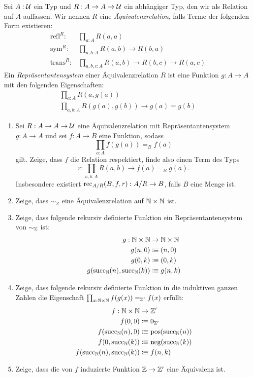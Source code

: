 \documentclass{uebung}
\begin{document}
\begin{bonus}
  Sei $A:\mathcal{U}$ ein Typ und $R:A \to A \to \mathcal{U}$ ein abhängiger Typ, den wir als Relation auf $A$ auffassen.
  Wir nennen $R$ eine \emph{Äquivalenzrelation}, falls Terme der folgenden Form existieren:
  \begin{align*}
    \mathrm{refl}^R :   & \prod_{a:A} R(a,a)\\
    \mathrm{sym}^R :    & \prod_{a,b:A} R(a,b) \to R(b,a)\\
    \mathrm{trans}^R :  & \prod_{a,b,c:A} R(a,b) \to R(b,c) \to R(a,c)
  \end{align*}
  Ein \emph{Repräsentantensystem} einer Äquivalenzrelation $R$ ist eine Funktion $g:A \to A$ mit den folgenden Eigenschaften:
  \begin{gather*}
    \prod_{a:A} R(a,g(a))\\
    \prod_{a,b:A} R(g(a),g(b)) \to g(a) = g(b)
  \end{gather*}

  \begin{enumerate}
    \item Sei $R:A \to A \to\mathcal{U}$ eine Äquivalenzrelation mit Repräsentantensystem $g:A \to A$ und sei $f:A \to B$ eine Funktion, sodass
      $$
      \prod_{a:A} f(g(a)) =_B f(a)
      $$
      gilt.
      Zeige, dass $f$ die Relation respektiert, finde also einen Term des Typs
      $$
      r:\prod_{a,b:A} R(a,b) \to f(a) =_B g(a).
      $$
      Insbesondere existiert $\mathrm{rec}_{A/R}(B,f,r):A/R\to B$, falls $B$ eine Menge ist.
    \item Zeige, dass $\sim_Z$ eine Äquivalenzrelation auf $\mathbb{N}\times\mathbb{N}$ ist.
    \item Zeige, dass folgende rekursiv definierte Funktion ein Repräsentantensystem von $\sim_{\mathbb{Z}}$ ist:
      \begin{align*}
        g : \mathbb{N}\times\mathbb{N} &\to \mathbb{N}\times\mathbb{N}\\
        g(n,0) &\vcentcolon\mspace{-1.2mu}\equiv (n,0)\\
        g(0,k) &\vcentcolon\mspace{-1.2mu}\equiv (0,k)\\
        g(\mathrm{succ}_{\mathbb{N}}(n),\mathrm{succ}_{\mathbb{N}}(k)) &\vcentcolon\mspace{-1.2mu}\equiv g(n,k)
      \end{align*}
    \item Zeige, dass folgende rekursiv definierte Funktion in die induktiven ganzen Zahlen die Eigenschaft $\prod_{x:\mathbb{N}\times \mathbb{N}} f(g(x)) =_{\mathbb{Z}'} f(x)$ erfüllt:
      \begin{align*}
        f:\mathbb{N}\times\mathbb{N} &\to \mathbb{Z}'\\
        f(0,0)       &\vcentcolon\mspace{-1.2mu}\equiv 0_{\mathbb{Z}'}\\
        f(\mathrm{succ}_{\mathbb{N}}(n),0) &\vcentcolon\mspace{-1.2mu}\equiv \mathrm{pos}(\mathrm{succ}_{\mathbb{N}}(n))\\
        f(0,\mathrm{succ}_{\mathbb{N}}(k)) &\vcentcolon\mspace{-1.2mu}\equiv \mathrm{neg}(\mathrm{succ}_{\mathbb{N}}(k))\\
        f(\mathrm{succ}_{\mathbb{N}}(n),\mathrm{succ}_{\mathbb{N}}(k)) &\vcentcolon\mspace{-1.2mu}\equiv f(n,k)
      \end{align*}
    \item Zeige, dass die von $f$ induzierte Funktion $\mathbb{Z}\to\mathbb{Z}'$ eine Äquivalenz ist.
  \end{enumerate}
\end{bonus}
\end{document}
